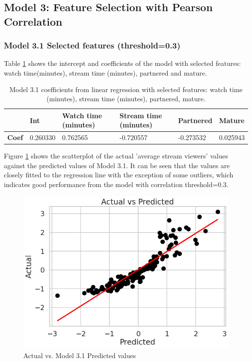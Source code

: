 \documentclass[runningheads]{llncs}
\begin{document}
\subsection{Model 3: Feature Selection with Pearson Correlation}

\subsubsection{Model 3.1 Selected features (threshold=0.3)}

Table \ref{tab:model3_1} shows the intercept and coefficients of the model with selected features: watch time(minutes), stream time (minutes), partnered and mature.  \\

\begingroup
\setlength{\tabcolsep}{5pt} %
\renewcommand{\arraystretch}{1} %
\begin{table}[h]
    \centering
    \caption{Model 3.1 coefficients from linear regression with selected features: watch time (minutes), stream time (minutes), partnered, mature.}
    \begin{tabular}{|p{.10\linewidth}|p{.12\linewidth}|p{.20\linewidth}|p{.20\linewidth}|p{.15\linewidth}|p{.15\linewidth}|}
        \hline
      & \textbf{Int} & \textbf{Watch time (minutes)} & \textbf{Stream time (minutes)} & \textbf{Partnered} & \textbf{Mature} \\
     \hline
     \textbf{Coef} & 0.260330 & 0.762565	& -0.720557	& -0.273532	& 0.025943 \\
   \hline
    \end{tabular}
    \label{tab:model3_1}
\end{table}
\endgroup 

Figure \ref{fig:model3_1} shows the scatterplot of the actual 'average stream viewers' values against the predicted values of Model 3.1. It can be seen that the values are closely fitted to the regression line with the exception of some outliers, which indicates good performance from the model with correlation threshold=0.3. \\

\begin{figure}[h]
    \centering
    \includegraphics[width=0.6\linewidth]{figures/graphs/model_3_1_graph.png}
    \caption{Actual vs. Model 3.1 Predicted values }
  \label{fig:model3_1}
\end{figure}
\end{document}
